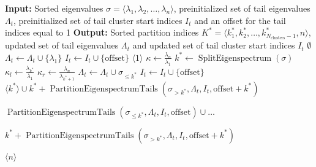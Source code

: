 \begin{algorithm}[H]
    \caption{$\operatorname{PartitionEigenspectrumTails}(\sigma, \Lambda_t\gets\emptyset, I_t\gets\emptyset, \text{offset}\gets1)$}
    \begin{algorithmic}[1]
        \State \textbf{Input:} Sorted eigenvalues $\sigma = \langle\lambda_1, \lambda_2, \ldots, \lambda_n\rangle$, preinitialized set of tail eigenvalues $\Lambda_t$, preinitialized set of tail cluster start indices $I_t$ and an offset for the tail indices equal to 1
        \State \textbf{Output:} Sorted partition indices $K^* = \langle k^*_1, k^*_2, \ldots, k^*_{N_{\text{clusters}}-1}, n\rangle$, updated set of tail eigenvalues $\Lambda_t$ and updated set of tail cluster start indices $I_t$
        \If{$\sigma = \emptyset$}
            \State \Return $\emptyset$
            \State $\Lambda_t \gets \Lambda_t \cup \{\lambda_1\}$ 
            \State $I_t \gets I_t \cup \{\text{offset}\}$
            \State \Return $\langle 1 \rangle$
        \EndIf
        \State $\kappa \gets \frac{\lambda_n}{\lambda_1}$
        \State $k^* \gets \operatorname{SplitEigenspectrum}(\sigma)$
        \State $\kappa_l \gets \frac{\lambda_{k^*}}{\lambda_1}$
        \State $\kappa_r \gets \frac{\lambda_n}{\lambda_{k^*+1}}$
            \State $\Lambda_t \gets \Lambda_t \cup \sigma_{\leq k^*}$ 
            \State $I_t \gets I_t \cup \{\text{offset}\}$
            \State \Return $\langle k^* \rangle \cup k^* + \operatorname{PartitionEigenspectrumTails}(\sigma_{>k^*}, \Lambda_t, I_t, \text{offset} + k^*)$
            \State \Return \begin{varwidth}[t]{\linewidth}
                $\operatorname{PartitionEigenspectrumTails}(\sigma_{\leq k^*}, \Lambda_t, I_t, \text{offset}) \cup \dots$\par
                $k^* + \operatorname{PartitionEigenspectrumTails}(\sigma_{>k^*}, \Lambda_t, I_t, \text{offset} + k^*)$
            \end{varwidth}
        \Else
            \State \Return $\langle n \rangle$ 
        \EndIf
    \end{algorithmic}
    \label{alg:partition_eigenspectrum_tails}
\end{algorithm}

